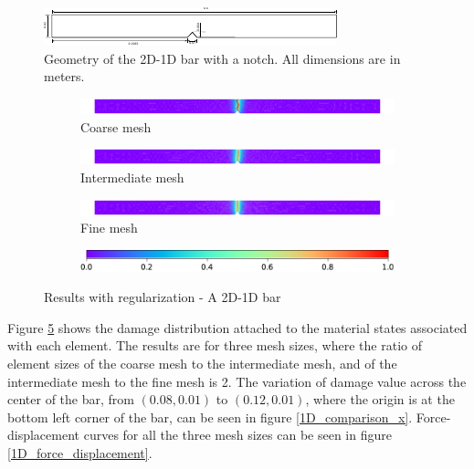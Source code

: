 \documentclass[11pt]{elsarticle}
\begin{document}
\begin{figure}
	\centering
	\includegraphics[width=\linewidth]{./Images/2d_1d_bar/2d_1d_bar.pdf}
	\caption{Geometry of the 2D-1D bar with a notch. All dimensions are in meters.}
	\label{2d_1d_bar_dims}
\end{figure}


\begin{figure}[ht]
	\begin{subfigure}{\textwidth}
		\centering
		\includegraphics[width=\linewidth]{./Images/2d_1d_bar/damage_coarse.pdf}
		\caption{Coarse mesh}
		\label{2d_1d_bar_damage_coarse}
	\end{subfigure}
	\begin{subfigure}{\textwidth}
		\centering
		\includegraphics[width=\linewidth]{./Images/2d_1d_bar/damage_inter.pdf}
		\caption{Intermediate mesh}
		\label{2d_1d_bar_damage_inter}
	\end{subfigure}
	\begin{subfigure}{\textwidth}
		\centering
		\includegraphics[width=\linewidth]{./Images/2d_1d_bar/damage_fine.pdf}
		\caption{Fine mesh}
		\label{2d_1d_bar_damage_fine}
	\end{subfigure}
	\begin{subfigure}{\textwidth}
		\centering
		\vfill
		\includegraphics[width=0.4\linewidth]{./Images/2d_1d_bar/cb.pdf}
	\end{subfigure}
	\caption{Results with regularization - A 2D-1D bar}
	\label{2d_1d_bar_damage}
\end{figure}

Figure \ref{2d_1d_bar_damage} shows the damage distribution attached to the material states associated with each element. The results are for three mesh sizes, where the ratio of element sizes of the coarse mesh to the intermediate mesh, and of the intermediate mesh to the fine mesh is 2. The variation of damage value across the center of the bar, from $(0.08,0.01)$ to $(0.12,0.01)$, where the origin is at the bottom left corner of the bar, can be seen in figure \ref{1D_comparison_x}. Force-displacement curves for all the three mesh sizes can be seen in figure \ref{1D_force_displacement}. 
\end{document}

